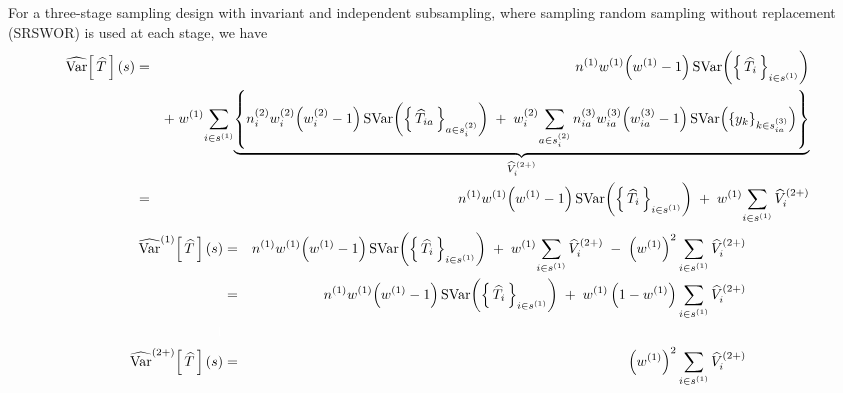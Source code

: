 \begin{corollary}\mbox{}\vskip 0.1cm
\noindent
For a three-stage sampling design with invariant and independent subsampling,
where sampling random sampling without replacement (SRSWOR) is used at each stage, we have
\begin{eqnarray*}
\widehat{\Var}\!\left[\,\widehat{T}\,\right](s)
&=& n^{(1)}w^{(1)}\!\left(w^{(1)}-1\right)\SVar\!\left(\left\{\,\widehat{T}_{i}\,\right\}_{i \in s^{(1)}}\right)\\
&& +\;
w^{(1)}\underset{i\in s^{(1)}}{\sum}
\underset{\widehat{V}^{(2+)}_{i}}{
\underbrace{
\left\{
n^{(2)}_{i}w^{(2)}_{i}\!\left(w^{(2)}_{i}-1\right)\SVar\!\left(\left\{\,\widehat{T}_{ia}\,\right\}_{a\in s^{(2)}_{i}}\right)
\;+\;
w^{(2)}_{i}\underset{a \in s^{(2)}_{i}}{\sum}\,n^{(3)}_{ia} w^{(3)}_{ia}\!\left(w^{(3)}_{ia}-1\right)\SVar\!\left(\left\{y_{k}\right\}_{k\in s^{(3)}_{ia}}\right)
\right\}
}%
}%
\\
&=& n^{(1)}w^{(1)}\!\left(w^{(1)}-1\right)\SVar\!\left(\left\{\,\widehat{T}_{i}\,\right\}_{i \in s^{(1)}}\right)\;+\;w^{(1)}\underset{i\in s^{(1)}}{\sum}\,\widehat{V}^{(2+)}_{i}
\end{eqnarray*}
\begin{eqnarray*}
\widehat{\Var}^{(1)}\!\left[\,\widehat{T}\,\right](s)
&=& n^{(1)}w^{(1)}\!\left(w^{(1)}-1\right)\SVar\!\left(\left\{\,\widehat{T}_{i}\,\right\}_{i \in s^{(1)}}\right)
\;+\;w^{(1)}\underset{i\in s^{(1)}}{\sum}\,\widehat{V}^{(2+)}_{i}
\;-\;\left(w^{(1)}\right)^{2}\underset{i\in s^{(1)}}{\sum}\,\widehat{V}^{(2+)}_{i}
\\
&=& n^{(1)}w^{(1)}\!\left(w^{(1)}-1\right)\SVar\!\left(\left\{\,\widehat{T}_{i}\,\right\}_{i \in s^{(1)}}\right)
\;+\;w^{(1)}\left(1 - w^{(1)}\right)\underset{i\in s^{(1)}}{\sum}\,\widehat{V}^{(2+)}_{i}
\\ {\color{white}1} \\
\widehat{\Var}^{(2+)}\!\left[\,\widehat{T}\,\right](s)
&=& \left(w^{(1)}\right)^{2}\underset{i\in s^{(1)}}{\sum}\,\widehat{V}^{(2+)}_{i}
\end{eqnarray*}
\end{corollary}







